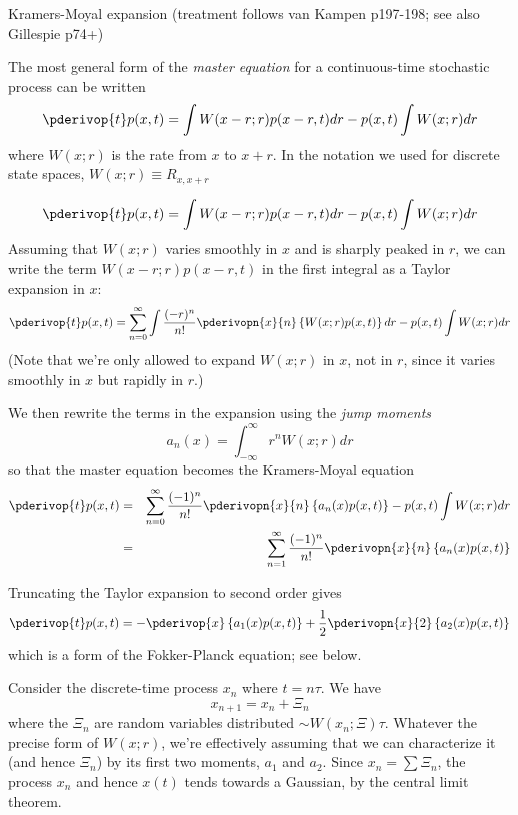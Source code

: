 \documentclass{beamer}
\begin{document}
\begin{frame}{}

Kramers-Moyal expansion (treatment follows van Kampen p197-198; see also Gillespie p74+)
 
  The most general form of the {\em master equation} for a continuous-time stochastic process can be written
\[
\pderivop{t} p(x,t) = \int W(x-r;r) p(x-r,t) dr - p(x,t) \int W(x;r) dr
\]
where $W(x;r)$ is the rate from $x$ to $x+r$.
In the notation we used for discrete state spaces, $W(x;r) \equiv R_{x,x+r}$
\end{frame}
\begin{frame}
\[
\pderivop{t} p(x,t) = \int W(x-r;r) p(x-r,t) dr - p(x,t) \int W(x;r) dr
\]
Assuming that $W(x;r)$ varies smoothly in $x$ and is sharply peaked in $r$,
we can write the term $W(x-r;r)p(x-r,t)$ in the first integral as a Taylor expansion in $x$:
\[
\pderivop{t} p(x,t) = \sum_{n=0}^\infty \int \frac{(-r)^n}{n!} \pderivopn{x}{n} \left\{ W(x;r) p(x,t) \right\} dr
 - p(x,t) \int W(x;r) dr
\]
(Note that we're only allowed to expand $W(x;r)$ in $x$, not in $r$, since it varies smoothly in $x$ but rapidly in $r$.)

\end{frame}

\begin{frame}{}

  We then rewrite the terms in the expansion using the {\em jump moments}
\[
a_n(x) = \int_{-\infty}^\infty r^n W(x;r) dr
\]
so that the master equation becomes the Kramers-Moyal equation
\begin{eqnarray*}
\pderivop{t} p(x,t) & = & \sum_{n=0}^\infty \frac{(-1)^n}{n!} \pderivopn{x}{n} \left\{ a_n(x) p(x,t) \right\}
 - p(x,t) \int W(x;r) dr \\
& = & \sum_{n=1}^\infty \frac{(-1)^n}{n!} \pderivopn{x}{n} \left\{ a_n(x) p(x,t) \right\}
\end{eqnarray*}
\end{frame}

\begin{frame}{}
Truncating the Taylor expansion to second order gives
\[
\pderivop{t} p(x,t) = -\pderivop{x} \left\{ a_1(x) p(x,t) \right\} + \frac{1}{2} \pderivopn{x}{2} \left\{ a_2(x) p(x,t) \right\}
\]
which is a form of the Fokker-Planck equation; see below.
\end{frame}

\begin{frame}{}
Consider the discrete-time process $x_n$ where $t = n \tau$. We have
\[
x_{n+1} = x_n + \Xi_n
\]
where the $\Xi_n$ are random variables distributed $\sim W(x_n;\Xi) \tau$.
Whatever the precise form of $W(x;r)$, we're effectively assuming that we can characterize it
(and hence $\Xi_n$) by its first two moments, $a_1$ and $a_2$.
Since $x_n = \sum \Xi_n$, the process $x_n$ and hence $x(t)$ tends towards a Gaussian, by the central limit theorem.
\end{frame}
\end{document}
